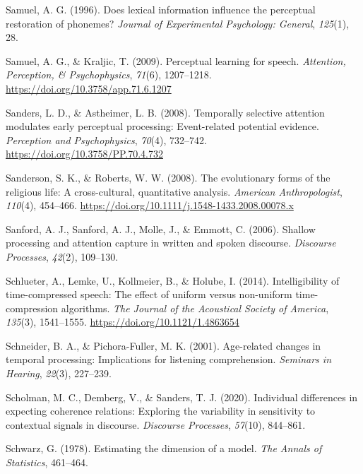 \documentclass[a4paper, nobind]{templates/ociamthesis}
\newlength{\cslhangindent}
\newenvironment{CSLReferences}[2] %
 {%
  \setlength{\parindent}{0pt}
  \ifodd #1
  \let\oldpar\par
  \def\par{\hangindent=\cslhangindent\oldpar}
  \fi
  \setlength{\parskip}{1mm}
  \setlength{\baselineskip}{6mm}
 }%
 {}
\begin{document}
\begin{CSLReferences}{1}{0}
\leavevmode{}%
Samuel, A. G. (1996). Does lexical information influence the perceptual restoration of phonemes? \emph{Journal of Experimental Psychology: General}, \emph{125}(1), 28.

\leavevmode{}%
Samuel, A. G., \& Kraljic, T. (2009). Perceptual learning for speech. \emph{Attention, Perception, \& Psychophysics}, \emph{71}(6), 1207--1218. \url{https://doi.org/10.3758/app.71.6.1207}

\leavevmode{}%
Sanders, L. D., \& Astheimer, L. B. (2008). {Temporally selective attention modulates early perceptual processing: Event-related potential evidence}. \emph{Perception and Psychophysics}, \emph{70}(4), 732--742. \url{https://doi.org/10.3758/PP.70.4.732}

\leavevmode{}%
Sanderson, S. K., \& Roberts, W. W. (2008). {The evolutionary forms of the religious life: A cross-cultural, quantitative analysis}. \emph{American Anthropologist}, \emph{110}(4), 454--466. \url{https://doi.org/10.1111/j.1548-1433.2008.00078.x}

\leavevmode{}%
Sanford, A. J., Sanford, A. J., Molle, J., \& Emmott, C. (2006). Shallow processing and attention capture in written and spoken discourse. \emph{Discourse Processes}, \emph{42}(2), 109--130.

\leavevmode{}%
Schlueter, A., Lemke, U., Kollmeier, B., \& Holube, I. (2014). {Intelligibility of time-compressed speech: The effect of uniform versus non-uniform time-compression algorithms}. \emph{The Journal of the Acoustical Society of America}, \emph{135}(3), 1541--1555. \url{https://doi.org/10.1121/1.4863654}

\leavevmode{}%
Schneider, B. A., \& Pichora-Fuller, M. K. (2001). Age-related changes in temporal processing: Implications for listening comprehension. \emph{Seminars in Hearing}, \emph{22}(3), 227--239.

\leavevmode{}%
Scholman, M. C., Demberg, V., \& Sanders, T. J. (2020). Individual differences in expecting coherence relations: Exploring the variability in sensitivity to contextual signals in discourse. \emph{Discourse Processes}, \emph{57}(10), 844--861.

\leavevmode{}%
Schwarz, G. (1978). Estimating the dimension of a model. \emph{The Annals of Statistics}, 461--464.


\end{CSLReferences}
\end{document}
